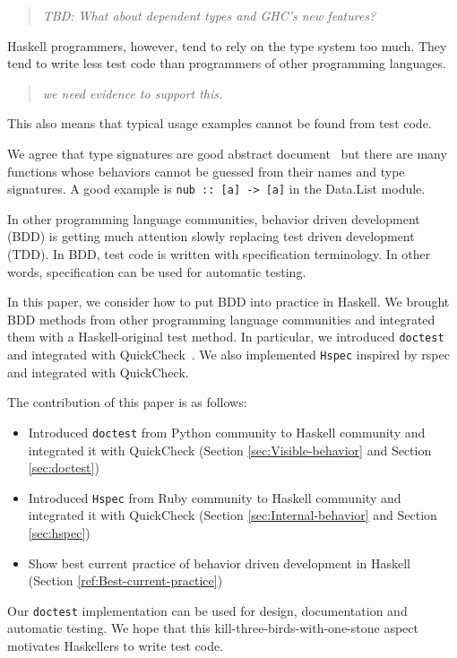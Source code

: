 \documentclass[preprint]{sigplanconf}
\begin{document}
\begin{quote}
    \emph{TBD: What about dependent types and GHC's new features?}
\end{quote}

Haskell programmers, however, tend to rely on the type system too much.  They
tend to write less test code than programmers of other programming languages.

\begin{quote}
    \emph{we need evidence to support this.}
\end{quote}

This also means that typical usage examples cannot be found from test code.

We agree that type signatures are good abstract document~\cite{free}
but there are many
functions whose behaviors cannot be guessed from their names and type
signatures. A good example is \verb|nub :: [a] -> [a]| in 
the Data.List module.

In other programming language communities,
behavior driven development (BDD) is getting much attention
slowly replacing test driven development (TDD).
In BDD, test code is written with specification terminology.
In other words, specification can be used for automatic testing.

In this paper, we consider how to put BDD into practice in Haskell.
We brought BDD methods from other programming language communities and
integrated them with a Haskell-original test method.
In particular, we introduced {\tt doctest}~\cite{doctest} and
integrated with QuickCheck~\cite{quickcheck}.
We also implemented {\tt Hspec} inspired by rspec~\cite{rspec}
and integrated with QuickCheck.

The contribution of this paper is as follows:

\begin{itemize}
\item Introduced {\tt doctest} from Python community to Haskell community
and integrated it with QuickCheck
(Section \ref{sec:Visible-behavior} and Section \ref{sec:doctest})
\item Introduced {\tt Hspec} from Ruby community to Haskell community and
integrated it with QuickCheck
(Section \ref{sec:Internal-behavior} and Section \ref{sec:hspec})
\item Show best current practice of behavior driven development in Haskell (Section \ref{ref:Best-current-practice})
\end{itemize}

\noindent Our {\tt doctest} implementation
can be used for design, documentation and automatic testing.
We hope that this kill-three-birds-with-one-stone aspect
motivates Haskellers to write test code.
\end{document}
